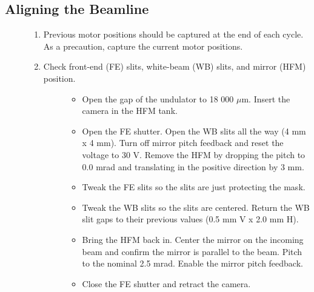 \documentclass[letterpaper,10pt,english]{sphinxmanual}
\begin{document}
\subsection{Aligning the Beamline}
\label{\detokenize{staff:aligning-the-beamline}}\begin{description}
\item[{}] \leavevmode\begin{enumerate}
\def\theenumi{\arabic{enumi}}
\def\labelenumi{\theenumi .}
\makeatletter\def\p@enumii{\p@enumi \theenumi .}\makeatother
\item {} 
Previous motor positions should be captured at the end of each cycle. As a precaution, capture the current motor positions.

\item {} \begin{description}
\item[{Check front-end (FE) slits, white-beam (WB) slits, and mirror (HFM) position.}] \leavevmode\begin{itemize}
\item {} 
Open the gap of the undulator to 18 000 \(\mu\)m. Insert the camera in the HFM tank.

\item {} 
Open the FE shutter. Open the WB slits all the way (4 mm x 4 mm). Turn off mirror pitch feedback and reset the voltage to 30 V. Remove the HFM by dropping the pitch to 0.0 mrad and translating in the positive direction by 3 mm.

\item {} 
Tweak the FE slits so the slits are just protecting the mask.

\item {} 
Tweak the WB slits so the slits are centered. Return the WB slit gaps to their previous values (0.5 mm V x 2.0 mm H).

\item {} 
Bring the HFM back in. Center the mirror on the incoming beam and confirm the mirror is parallel to the beam. Pitch to the nominal 2.5 mrad. Enable the mirror pitch feedback.

\item {} 
Close the FE shutter and retract the camera.


\end{itemize}
\end{description}
\end{enumerate}
\end{description}
\end{document}
